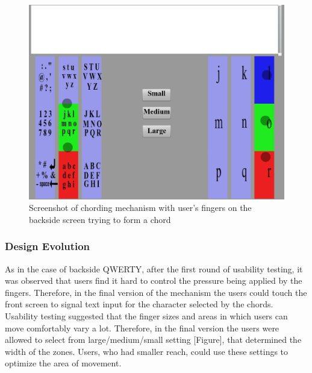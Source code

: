 \begin{figure}
    \includegraphics[scale=0.45]{chording.eps} 
  	\caption{Screenshot of chording mechanism with user's fingers on the backside screen trying to form a chord}
\end{figure} 
\subsubsection{Design Evolution}
As in the case of backside QWERTY, after the first round of usability testing, it was observed that users find it hard to control the pressure being applied by the fingers. Therefore, in the final version of the mechanism the users could touch the front screen to signal text input for the character selected by the chords.
Usability testing suggested that the finger sizes and areas in which users can move comfortably vary a lot. Therefore, in the final version the users were allowed to select from large/medium/small setting [Figure], that determined the width of the zones. Users, who had smaller reach, could use these settings to optimize the area of movement.